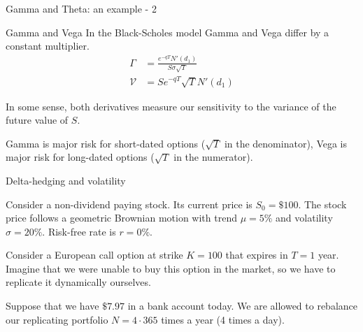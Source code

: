 \documentclass{beamer}
\begin{document}
\begin{frame}{Gamma and Theta: an example - 2}
\centering
{}
\end{frame}



\begin{frame}{Gamma and Vega}
\justify
In the Black-Scholes model Gamma and Vega differ by a constant multiplier.
\begin{align*}
\Gamma &= \frac{e^{-qT}N'(d_1)}{S\sigma\sqrt{T}} \\
\mathcal{V} &= Se^{-qT}\sqrt{T}N'(d_1)
\end{align*}

\justify
In some sense, both derivatives measure our sensitivity to the variance of the future value of $S$.

\justify
Gamma is major risk for short-dated options ($\sqrt{T}$ in the denominator), Vega is major risk for long-dated options ($\sqrt{T}$ in the numerator). 
\end{frame}



\begin{frame}{Delta-hedging and volatility}

\justify
Consider a non-dividend paying stock. Its current price is $S_0=\$100$. The stock price follows a geometric Brownian motion with trend $\mu=5\%$ and volatility $\sigma=20\%$. Risk-free rate is $r=0\%$.

\justify
Consider a European call option at strike $K=100$ that expires in $T=1$ year. Imagine that we were unable to buy this option in the market, so we have to replicate it dynamically ourselves.

\justify
Suppose that we have $\$7.97$ in  a bank account today. We are allowed to rebalance our replicating portfolio $N=4 \cdot 365$ times a year (4 times a day).

\end{frame}
\end{document}
